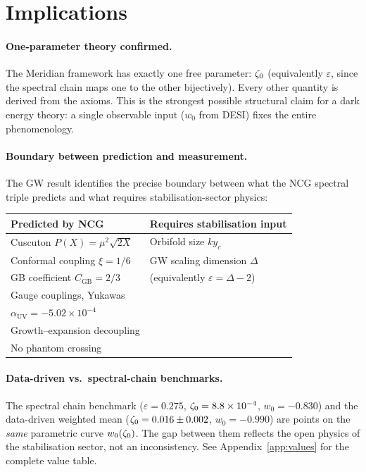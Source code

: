\section{Implications}
\label{app:gw-implications}

\paragraph{One-parameter theory confirmed.}
The Meridian framework has exactly one free parameter: $\zeta_0$ (equivalently $\varepsilon$, since the spectral chain maps one to the other bijectively).  Every other quantity is derived from the axioms.  This is the strongest possible structural claim for a dark energy theory: a single observable input ($w_0$ from DESI) fixes the entire phenomenology.

\paragraph{Boundary between prediction and measurement.}
The GW result identifies the precise boundary between what the NCG spectral triple predicts and what requires stabilisation-sector physics:
\begin{center}
\small
\renewcommand{\arraystretch}{1.15}
\begin{tabular}{@{}ll@{}}
\toprule
\textbf{Predicted by NCG} & \textbf{Requires stabilisation input} \\
\midrule
Cuscuton $P(X) = \mu^2\sqrt{2X}$ & Orbifold size $ky_c$ \\
Conformal coupling $\xi = 1/6$ & GW scaling dimension $\Delta$ \\
GB coefficient $C_\mathrm{GB} = 2/3$ & (equivalently $\varepsilon = \Delta - 2$) \\
Gauge couplings, Yukawas & \\
$\alpha_\mathrm{UV} = -5.02 \times 10^{-4}$ & \\
Growth--expansion decoupling & \\
No phantom crossing & \\
\bottomrule
\end{tabular}
\end{center}

\paragraph{Data-driven vs.\ spectral-chain benchmarks.}
The spectral chain benchmark ($\varepsilon = 0.275$, $\zeta_0 = 8.8 \times 10^{-4}$, $w_0 = -0.830$) and the data-driven weighted mean ($\zeta_0 = 0.016 \pm 0.002$, $w_0 = -0.990$) are points on the \emph{same} parametric curve $w_0(\zeta_0)$.  The gap between them reflects the open physics of the stabilisation sector, not an inconsistency.  See Appendix~\ref{app:values} for the complete value table.

